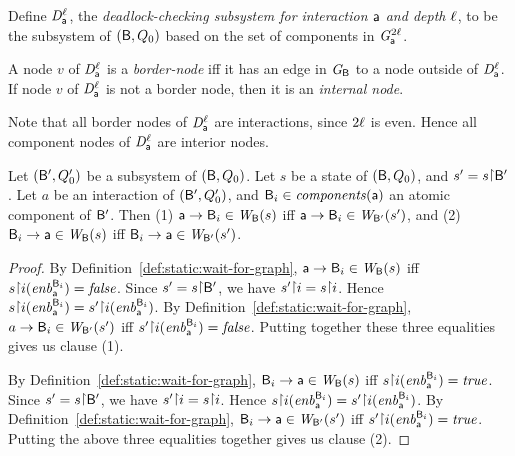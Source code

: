 \begin{definition} \label{def:dsk}
Define $\mathit{D}_{\mathsf{a}}^{\ell}$, the \emph{deadlock-checking subsystem for interaction $\mathsf{a}$ and
depth $\ell$}, to be the subsystem of $(\mathsf{B}, Q_0)$ based on the set of
components in $\mathit{G}_{\mathsf{a}}^{2\ell}$.  %
\end{definition}

\begin{definition}  \label{def:dsk.border-and internal}
A node $v$ of $\mathit{D}_{\mathsf{a}}^{\ell}$ is a \emph{border-node} iff it has an
edge in $\mathit{G}_{\mathsf{B}}$ to a node outside of $\mathit{D}_{\mathsf{a}}^{\ell}$.
If node $v$ of $\mathit{D}_{\mathsf{a}}^{\ell}$ is not a border node, then it is an \emph{internal node}.
\end{definition}
Note that all border nodes of  $\mathit{D}_{\mathsf{a}}^{\ell}$ are interactions,
since $2\ell$ is even. Hence all component nodes of $\mathit{D}_{\mathsf{a}}^{\ell}$ are
interior nodes.


\begin{proposition} \label{prop:edge-projection}
Let $(\mathsf{B}', Q'_0)$ be a subsystem of
$(\mathsf{B}, Q_0)$. Let $s$ be a state of $(\mathsf{B}, Q_0)$, and $s' = s \pj \B'$.
Let $a$ be an interaction of $(\mathsf{B}', Q'_0)$, and $\mathsf{B}_i \in \mathit{components}(\mathsf{a})$ an atomic component of $\mathsf{B}'$.
Then 
(1) $\mathsf{a} \rightarrow \mathsf{B}_i \in \mathit{W}_{\mathsf{B}}({s})$ iff $\mathsf{a} \rightarrow \mathsf{B}_i \in \mathit{W}_{\mathsf{B}'}({s'})$, and
(2) $\mathsf{B}_i \rightarrow \mathsf{a} \in \mathit{W}_{\mathsf{B}}({s})$ iff $\mathsf{B}_i \rightarrow \mathsf{a} \in \mathit{W}_{\mathsf{B}'}({s'})$.
\end{proposition}
%
\begin{proof}
By Definition~\ref{def:static:wait-for-graph}, $\mathsf{a} \rightarrow \mathsf{B}_i \in \mathit{W}_{\mathsf{B}}({s})$ iff $s \pj i (\gd{\act}{\B_i}) = \false$.
Since $s' = s \pj \B'$, we have $s' \pj i = s \pj i$. Hence
$s \pj i (\gd{\act}{\B_i}) = s' \pj i (\gd{\act}{\B_i})$.
By Definition~\ref{def:static:wait-for-graph}, 
$a \rightarrow \mathsf{B}_i \in \mathit{W}_{\mathsf{B}'}({s'})$ iff $s' \pj i (\gd{\act}{\B_i}) = \false$.
Putting together these three equalities gives us clause (1).

By Definition~\ref{def:static:wait-for-graph},
$\mathsf{B}_i \rightarrow \mathsf{a} \in \mathit{W}_{\mathsf{B}}({s})$ iff 
$s \pj i (\gd{\act}{\B_i}) = \true$.
Since $s' = s \pj \B'$, we have $s' \pj i = s \pj i$. Hence
$s \pj i (\gd{\act}{\B_i}) = s' \pj i (\gd{\act}{\B_i})$.
By Definition~\ref{def:static:wait-for-graph},
$\mathsf{B}_i \rightarrow \mathsf{a} \in \mathit{W}_{\mathsf{B}'}({s'})$ iff $s' \pj i (\gd{\act}{\B_i}) = \true$.
Putting the above three equalities together gives us clause (2).
\end{proof}

